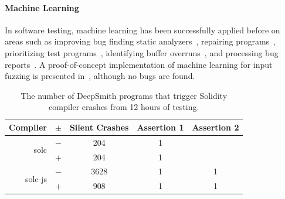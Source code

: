 








\paragraph{Machine Learning} In software testing,
machine learning has been successfully applied before on areas such as improving bug finding static analyzers~\cite{Heo2017,Koc2017}, repairing programs~\cite{Koukoutos2017a,White}, prioritizing test programs~\cite{Chen2017}, identifying buffer overruns~\cite{Choi2016}, and processing bug reports~\cite{Lam2016,Huo2016}. A proof-of-concept implementation of machine learning for input fuzzing is presented in~\cite{Godefroid2017}, although no bugs are found. %

\begin{table}
	\footnotesize %
	\centering %
	\begin{tabular}{rc|ccc}
\toprule
  \textbf{Compiler} & $\pm$ & \textbf{Silent Crashes} & \textbf{Assertion 1} & \textbf{Assertion 2}\\
\midrule
  \multirow{ 2}{*}{solc} & $-$ & 204 & 1 & \\
                         & $+$ & 204 & 1 & \\
  \multirow{ 2}{*}{solc-js} & $-$ & 3628 & 1 & 1\\
                         & $+$ & 908 & 1 & 1\\
\bottomrule
\end{tabular}
	\caption{%
		The number of DeepSmith programs that trigger Solidity compiler crashes from 12 hours of testing.%
     \vspace{-1em}
	}
   \vspace{-2em}
	\label{tab:solidity}
\end{table}

